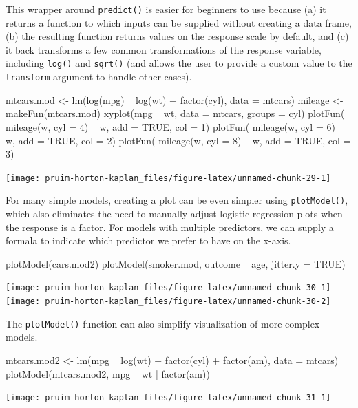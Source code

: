 This wrapper around \texttt{predict()} is easier for beginners to use
because (a) it returns a function to which inputs can be supplied
without creating a data frame, (b) the resulting function returns values
on the response scale by default, and (c) it back transforms a few
common transformations of the response variable, including
\texttt{log()} and \texttt{sqrt()} (and allows the user to provide a
custom value to the \texttt{transform} argument to handle other cases).

\begin{Schunk}
\begin{Sinput}
mtcars.mod <- lm(log(mpg) ~ log(wt) + factor(cyl), data = mtcars)
mileage <- makeFun(mtcars.mod)
xyplot(mpg ~ wt, data = mtcars, groups = cyl)
plotFun( mileage(w, cyl = 4) ~ w, add = TRUE, col = 1)
plotFun( mileage(w, cyl = 6) ~ w, add = TRUE, col = 2)
plotFun( mileage(w, cyl = 8) ~ w, add = TRUE, col = 3)
\end{Sinput}


\begin{center}\texttt{[image: pruim-horton-kaplan\_files/figure-latex/unnamed-chunk-29-1]} \end{center}

\end{Schunk}

For many simple models, creating a plot can be even simpler using
\texttt{plotModel()}, which also eliminates the need to manually adjust
logistic regression plots when the response is a factor. For models with
multiple predictors, we can supply a formala to indicate which predictor
we prefer to have on the x-axis.

\begin{Schunk}
\begin{Sinput}
plotModel(cars.mod2)
plotModel(smoker.mod, outcome ~ age, jitter.y = TRUE)
\end{Sinput}


\begin{center}\texttt{[image: pruim-horton-kaplan\_files/figure-latex/unnamed-chunk-30-1]} \texttt{[image: pruim-horton-kaplan\_files/figure-latex/unnamed-chunk-30-2]} \end{center}

\end{Schunk}

\noindent
The \texttt{plotModel()} function can also simplify visualization of
more complex models.

\begin{Schunk}
\begin{Sinput}
mtcars.mod2 <- lm(mpg ~ log(wt) + factor(cyl) + factor(am), data = mtcars)
plotModel(mtcars.mod2, mpg ~ wt | factor(am))
\end{Sinput}


\begin{center}\texttt{[image: pruim-horton-kaplan\_files/figure-latex/unnamed-chunk-31-1]} \end{center}

\end{Schunk}


